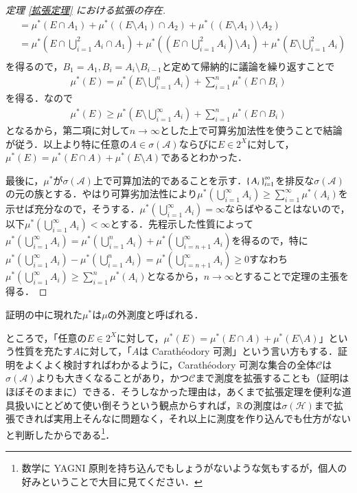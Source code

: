 \begin{proof}[定理 \ref{拡張定理} における拡張の存在]
\begin{align}
&= \mu^*(E \cap A_1) + \mu^*((E \setminus A_1) \cap A_2) + \mu^*((E \setminus A_1) \setminus A_2)\\
&= \mu^*\left( E \cap \bigcup_{i=1}^2 A_i \cap A_1\right) + \mu^*\left(\left( E \cap \bigcup_{i=1}^2 A_i\right) \setminus A_1\right) + \mu^*\left(E \setminus \bigcup_{i=1}^2 A_i\right)\\
\end{align}を得るので，$B_1=A_1, B_i = A_i \setminus B_{i-1}$と定めて帰納的に議論を繰り返すことで
\begin{align}
\mu^*(E) = \mu^*\left(E \setminus \bigcup_{i=1}^n A_i\right) + \sum_{i=1}^n \mu^*\left( E \cap B_i \right)
\end{align}を得る．なので
\begin{align}
\mu^*(E) \geq \mu^*\left(E \setminus \bigcup_{i=1}^\infty A_i\right) + \sum_{i=1}^n \mu^*\left( E \cap B_i \right)
\end{align}となるから，第二項に対して$n\to \infty$とした上で可算劣加法性を使うことで結論が従う．以上より特に任意の$A \in \sigma(\mathcal{A})$ならびに$E \in 2^X$に対して，$\mu^*(E) = \mu^*(E \cap A) + \mu^*(E \setminus A)$であるとわかった．

最後に，$\mu^*$が$\sigma(\mathcal{A})$上で可算加法的であることを示す．$\set{A_i}_{i=1}^\infty$を排反な$\sigma(\mathcal{A})$の元の族とする．やはり可算劣加法性により$\mu^*\left(\bigcup_{i=1}^\infty A_i\right) \geq \sum_{i=1}^\infty \mu^*(A_i)$を示せば充分なので，そうする．$\mu^*\left(\bigcup_{i=1}^\infty A_i\right) = \infty$ならばやることはないので，以下$\mu^*\left(\bigcup_{i=1}^\infty A_i\right) < \infty$とする．先程示した性質によって$\mu^*\left(\bigcup_{i=1}^\infty A_i\right) = \mu^*\left( \bigcup_{i=1}^n A_i\right) + \mu^*\left(\bigcup_{i=n+1}^\infty A_i\right)$を得るので，特に$\mu^*\left(\bigcup_{i=1}^\infty A_i\right) - \mu^*\left( \bigcup_{i=1}^n A_i\right) = \mu^*\left(\bigcup_{i=n+1}^\infty A_i\right) \geq 0$すなわち$\mu^*\left(\bigcup_{i=1}^\infty A_i\right) \geq \sum_{i=1}^n \mu^*\left( A_i\right)$となるから，$n\to \infty$とすることで定理の主張を得る．
\end{proof}

\begin{dig}
証明の中に現れた$\mu^*$は$\mu$の外測度と呼ばれる．

ところで，「任意の$E \in 2^X$に対して，$\mu^*(E) = \mu^*(E \cap A) + \mu^*(E \setminus A)$」という性質を充たす$A$に対して，「$A$は Carath\'eodory 可測」という言い方もする．証明をよくよく検討すればわかるように，Carath\'eodory 可測な集合の全体$\mathcal{C}$は$\sigma(\mathcal{A})$よりも大きくなることがあり，かつ$\mathcal{C}$まで測度を拡張することも（証明はほぼそのままに）できる．そうしなかった理由は，あくまで拡張定理を便利な道具扱いにとどめて使い倒そうという観点からすれば，$\mathbb{R}$の測度は$\sigma\left(\mathcal{H}\right)$まで拡張できれば実用上そんなに問題なく，それ以上に測度を作り込んでも仕方がないと判断したからである\footnote{数学に YAGNI 原則を持ち込んでもしょうがないような気もするが，個人の好みということで大目に見てください．}．
\end{dig}

